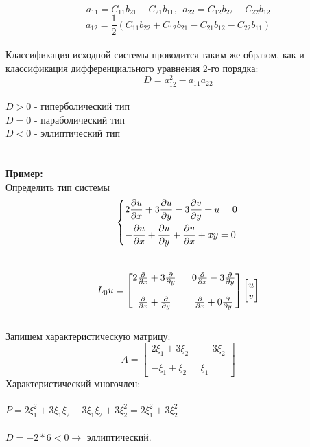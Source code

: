 \documentclass[../main.tex]{subfiles}
\begin{document}
$$a_{11} = C_{11}b_{21} - C_{21}b_{11}, \ \ 
a_{22} = C_{12}b_{22} - C_{22}b_{12}$$
$$a_{12} = \frac{1}{2}(C_{11}b_{22} + C_{12}b_{21} - C_{21}b_{12} - C_{22}b_{11})$$ \\ 
Классификация исходной системы проводится таким же образом, как и классификация дифференциального уравнения 2-го порядка:
\\$$D = a_{12}^2 - a_{11}a_{22} $$ \\
$D > 0$ - гиперболический тип \\
$D = 0$ - параболический тип \\
$D < 0$ - эллиптический тип \\
\\
\\
\textbf{Пример:}\\
Определить тип системы
$$
\begin{dcases}
2\frac{\partial u}{\partial x} + 3\frac{\partial u}{\partial y}-3\frac{\partial v}{\partial y}+u=0 \\
-\frac{\partial u}{\partial x} + \frac{\partial u}{\partial y}+\frac{\partial v}{\partial x}+xy=0
\end{dcases} \\ 
$$ \\ 
$$L_{0}u = \begin{bmatrix}
2\frac{\partial }{\partial x}+3\frac{\partial }{\partial y} \ & \ 0\frac{\partial }{\partial x}-3\frac{\partial }{\partial y} \\ \\
\frac{\partial }{\partial x}+\frac{\partial }{\partial y}\ & \ \frac{\partial }{\partial x} + 0\frac{\partial }{\partial y} 
\end{bmatrix}\begin{bmatrix}
u \\ v
\end{bmatrix}$$ \\
Запишем характеристическую матрицу:
$$A = \begin{bmatrix}
2\xi_1+3\xi_2 \ & \ -3\xi_2 \\ \\
-\xi_1 + \xi_2 \  & \ \xi_1 
\end{bmatrix}$$
Характеристический многочлен:\\ \\
$P = 2\xi_1^2 + 3\xi_1\xi_2-3\xi_1\xi_2+3\xi_2^2=2\xi_1^2+3\xi_2^2$ \\ \\
$D = -2*6<0\rightarrow $ эллиптический.
\end{document}
